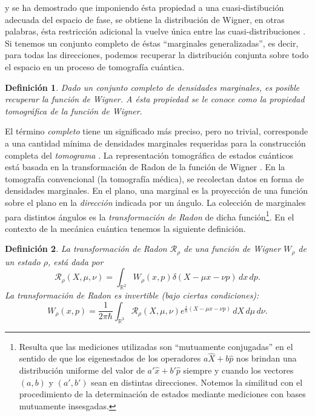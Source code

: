\documentclass[a4paper,11pt]{report}
\DeclareMathOperator{\R}{\mathbb{R}}
\newtheorem{definition}{Definición}
\begin{document}
  y se ha demostrado que imponiendo ésta propiedad a una
  cuasi-distibución adecuada del espacio de fase, se obtiene
  la distribución de Wigner, en otras palabras, ésta
  restricción adicional la vuelve única entre las
  cuasi-distribuciones \cite{ellinas2008}. Si tenemos un
  conjunto completo de éstas ``marginales generalizadas'',
  es decir, para todas las direcciones, podemos recuperar la
  distribución conjunta sobre todo el espacio en un proceso
  de tomografía cuántica.
  \begin{definition}
    \label{def:tomo_prop}
    Dado un conjunto completo de densidades marginales, es
    posible recuperar la función de Wigner. A ésta propiedad
    se le conoce como la propiedad tomográfica de la función
    de Wigner.
  \end{definition}
  El término \textit{completo} tiene un significado más
  preciso, pero no trivial, corresponde a una cantidad
  mínima de densidades marginales requeridas para la
  construcción completa del \textit{tomograma}
  \cite{ibort2009}. La representación tomográfica de estados
  cuánticos está basada en la transformación de Radon de la
  función de Wigner \cite{degosson2022}. En la tomografía
  convencional (la tomografía médica), se recolectan datos
  en forma de densidades marginales. En el plano, una
  marginal es la proyección de una función sobre el plano en
  la \textit{dirección} indicada por un ángulo.  La
  colección de marginales para distintos ángulos es la
  \textit{transformación de Radon} de dicha
  función\footnote{Resulta que las mediciones utilizadas son
    ``mutuamente conjugadas'' en el sentido de que los
    eigenestados de los operadores $a \hat X + b \hat p$ nos
    brindan una distribución uniforme del valor de $a' \hat
    x + b' \hat p$ siempre y cuando los vectores $(a,b)$ y
    $(a',b')$ sean en distintas direcciones. Notemos la
    similitud con el procedimiento de la determinación de
  estados mediante mediciones con bases mutuamente
  insesgadas.}. En el contexto de la mecánica cuántica tenemos
  la siguiente definición. 
  \begin{definition}
    La transformación de Radon $\mathcal R_{\rho}$ de una
    función de Wigner $W_\rho$ de un estado $\rho$, está
    dada por
    \begin{equation}
      \mathcal R_{\rho}\left( X, \mu, \nu \right) 
      = \int_{\R^2} W_\rho(x,p) \delta(X - \mu x - \nu p)
      \, dx \, dp.
    \end{equation}
    La transformación de Radon es invertible (bajo ciertas
    condiciones):
    \begin{equation}
      W_\rho(x,p)
      = \frac{1}{2\pi \hbar}
      \int_{\R^3} \mathcal R_{\rho}(X, \mu, \nu)
      e^{\frac{i}{\hbar}\left( X - \mu x - \nu p \right)} \,
      dX \, d\mu \, d\nu.
    \end{equation}
  \end{definition}
\end{document}
